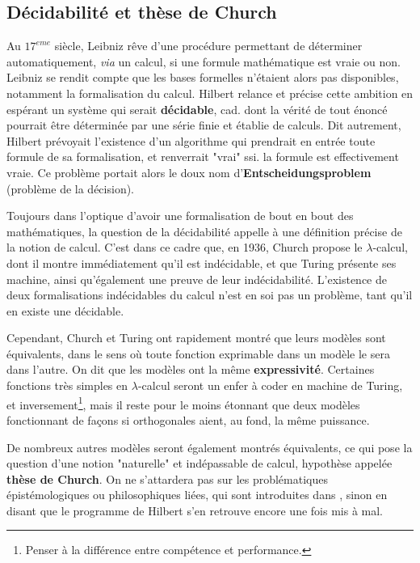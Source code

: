 \subsection{Décidabilité et thèse de Church} 

Au $17^{eme}$ siècle, Leibniz rêve d'une procédure permettant de déterminer automatiquement, \textit{via} un calcul, si une formule mathématique est vraie ou non. Leibniz se rendit compte que les bases formelles n'étaient alors pas disponibles, notamment la formalisation du calcul. Hilbert relance et précise cette ambition en espérant un système qui serait \textbf{décidable}, cad. dont la vérité de tout énoncé pourrait être déterminée par une série finie et établie de calculs. Dit autrement, Hilbert prévoyait l'existence d'un algorithme qui prendrait en entrée toute formule de sa formalisation, et renverrait "vrai" ssi. la formule est effectivement vraie. Ce problème portait alors le doux nom d'\textbf{Entscheidungsproblem} (problème de la décision).

Toujours dans l'optique d'avoir une formalisation de bout en bout des mathématiques, la question de la décidabilité appelle à une définition précise de la notion de calcul. C'est dans ce cadre que, en 1936, Church propose le $\lambda$-calcul, dont il montre immédiatement qu'il est indécidable, et que Turing présente ses machine, ainsi qu'également une preuve de leur indécidabilité. L'existence de deux formalisations indécidables du calcul n'est en soi pas un problème, tant qu'il en existe une décidable. 

Cependant, Church et Turing ont rapidement montré que leurs modèles sont équivalents, dans le sens où toute fonction exprimable dans un modèle le sera dans l'autre. On dit que les modèles ont la même \textbf{expressivité}. Certaines fonctions très simples en $\lambda$-calcul seront un enfer à coder en machine de Turing, et inversement\footnote{Penser à la différence entre compétence et performance.}, mais il reste pour le moins étonnant que deux modèles fonctionnant de façons si orthogonales aient, au fond, la même puissance. 

De nombreux autres modèles seront également montrés équivalents, ce qui pose la question d'une notion "naturelle" et indépassable de calcul, hypothèse appelée \textbf{thèse de Church}. On ne s'attardera pas sur les problématiques épistémologiques ou philosophiques liées, qui sont introduites dans \cite{dowek}, sinon en disant que le programme de Hilbert s'en retrouve encore une fois mis à mal.

